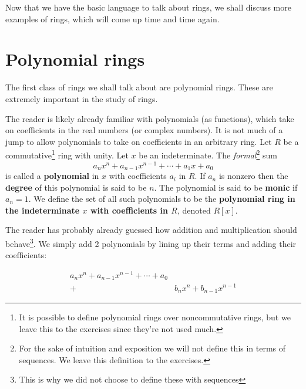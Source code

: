 \documentclass[./main.tex]{subfiles}
\begin{document}
Now that we have the basic language to talk about rings, we shall discuss more
examples of rings, which will come up time and time again. 

\section{Polynomial rings}
The first class of rings we shall talk about are polynomial rings. These are
extremely important in the study of rings.

The reader is likely already familiar with polynomials (as functions), which
take on coefficients in the real numbers (or complex numbers). It is not much of
a jump to allow polynomials to take on coefficients in an arbitrary ring. Let
$R$ be a commutative\footnote{It is possible to define polynomial rings over
noncommutative rings, but we leave this to the exercises since they're not used
much.} ring with unity. Let $x$ be an indeterminate. The
\emph{formal}\footnote{For the sake of intuition and exposition we will not
define this in terms of sequences. We leave this definition to the exercises.}
sum 
\[
    a_n x^n + a_{n-1} x^{n-1} + \cdots + a_1 x + a_0
\]
is called a \textbf{polynomial} in $x$ with coefficients $a_i$ in $R$. If $a_n$
is nonzero then the \textbf{degree} of this polynomial is said to be $n$. The
polynomial is said to be \textbf{monic} if $a_n = 1$. We define the set of all
such polynomials to be the \textbf{polynomial ring in the indeterminate $x$ with
coefficients in $R$}, denoted $R[x]$. 

The reader has probably already guessed how addition and multiplication should
behave\footnote{This is why we did not choose to define these with sequences}.
We simply add 2 polynomials by lining up their terms and adding their
coefficients:

\begin{align*}
    a_n x^n + a_{n-1} x^{n-1} + \cdots + a_0 \\
    + &b_n x^n + b_{n-1} x^{n-1}
\end{align*}
\end{document}
